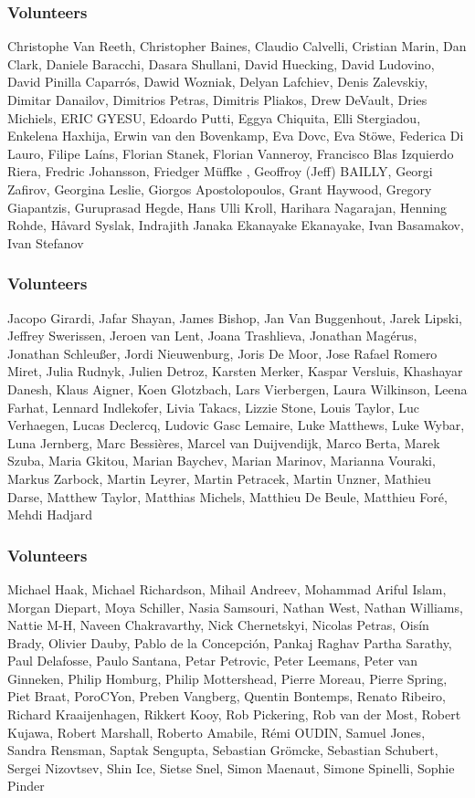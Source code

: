 \documentclass[aspectratio=169]{beamer}
\begin{document}
\begin{frame}
	\frametitle{Volunteers}
	Christophe Van Reeth, Christopher Baines, Claudio Calvelli, Cristian Marin, Dan Clark, Daniele Baracchi, Dasara Shullani, David Huecking, David Ludovino, David Pinilla Caparrós, Dawid Wozniak, Delyan Lafchiev, Denis Zalevskiy, Dimitar Danailov, Dimitrios Petras, Dimitris Pliakos, Drew DeVault, Dries Michiels, ERIC GYESU, Edoardo Putti, Eggya Chiquita, Elli Stergiadou, Enkelena Haxhija, Erwin van den Bovenkamp, Eva Dovc, Eva Stöwe, Federica Di Lauro, Filipe Laíns, Florian Stanek, Florian Vanneroy, Francisco Blas Izquierdo Riera, Fredric Johansson, Friedger  Müffke , Geoffroy (Jeff) BAILLY, Georgi Zafirov, Georgina Leslie, Giorgos Apostolopoulos, Grant Haywood, Gregory Giapantzis, Guruprasad Hegde, Hans Ulli Kroll, Harihara Nagarajan, Henning Rohde, Håvard Syslak, Indrajith Janaka Ekanayake Ekanayake, Ivan Basamakov, Ivan Stefanov
\end{frame}

\begin{frame}
	\frametitle{Volunteers}
	Jacopo Girardi, Jafar Shayan, James Bishop, Jan Van Buggenhout, Jarek Lipski, Jeffrey Swerissen, Jeroen van Lent, Joana Trashlieva, Jonathan Magérus, Jonathan Schleußer, Jordi Nieuwenburg, Joris De Moor, Jose Rafael Romero Miret, Julia Rudnyk, Julien Detroz, Karsten Merker, Kaspar Versluis, Khashayar Danesh, Klaus Aigner, Koen Glotzbach, Lars Vierbergen, Laura Wilkinson, Leena Farhat, Lennard Indlekofer, Livia Takacs, Lizzie Stone, Louis Taylor, Luc Verhaegen, Lucas Declercq, Ludovic Gasc Lemaire, Luke Matthews, Luke Wybar, Luna Jernberg, Marc Bessières, Marcel van Duijvendijk, Marco Berta, Marek Szuba, Maria Gkitou, Marian Baychev, Marian Marinov, Marianna Vouraki, Markus Zarbock, Martin Leyrer, Martin Petracek, Martin Unzner, Mathieu Darse, Matthew Taylor, Matthias Michels, Matthieu De Beule, Matthieu Foré, Mehdi Hadjard
\end{frame}

\begin{frame}
	\frametitle{Volunteers}
	Michael Haak, Michael Richardson, Mihail Andreev, Mohammad Ariful Islam, Morgan Diepart, Moya Schiller, Nasia Samsouri, Nathan West, Nathan Williams, Nattie M-H, Naveen Chakravarthy, Nick Chernetskyi, Nicolas Petras, Oisín Brady, Olivier Dauby, Pablo de la Concepción, Pankaj Raghav Partha Sarathy, Paul Delafosse, Paulo Santana, Petar Petrovic, Peter Leemans, Peter van Ginneken, Philip Homburg, Philip Mottershead, Pierre Moreau, Pierre Spring, Piet Braat, PoroCYon, Preben Vangberg, Quentin Bontemps, Renato Ribeiro, Richard Kraaijenhagen, Rikkert Kooy, Rob Pickering, Rob van der Most, Robert Kujawa, Robert Marshall, Roberto Amabile, Rémi OUDIN, Samuel Jones, Sandra Rensman, Saptak Sengupta, Sebastian Grömcke, Sebastian Schubert, Sergei Nizovtsev, Shin Ice, Sietse Snel, Simon Maenaut, Simone Spinelli, Sophie Pinder
\end{frame}
\end{document}
